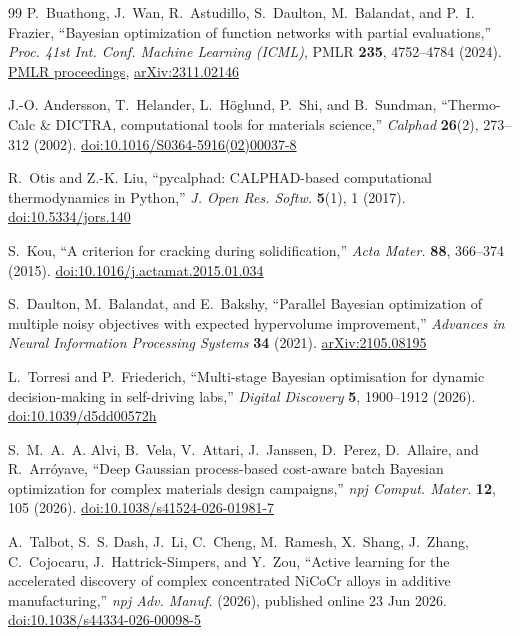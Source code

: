 \documentclass[12pt,letterpaper]{article}
\begin{document}
\begin{thebibliography}{99}
P.~Buathong, J.~Wan, R.~Astudillo, S.~Daulton, M.~Balandat, and P.~I. Frazier,
``Bayesian optimization of function networks with partial evaluations,''
\emph{Proc. 41st Int. Conf. Machine Learning (ICML)}, PMLR \textbf{235},
4752--4784 (2024).
\href{https://proceedings.mlr.press/v235/buathong24a.html}{PMLR proceedings},
\href{https://arxiv.org/abs/2311.02146}{arXiv:2311.02146}

J.-O. Andersson, T.~Helander, L.~H{\"o}glund, P.~Shi, and B.~Sundman,
``Thermo-Calc \& DICTRA, computational tools for materials science,''
\emph{Calphad} \textbf{26}(2), 273--312 (2002).
\href{https://doi.org/10.1016/S0364-5916(02)00037-8}{doi:10.1016/S0364-5916(02)00037-8}

R.~Otis and Z.-K. Liu, ``pycalphad: CALPHAD-based computational thermodynamics
in Python,'' \emph{J. Open Res. Softw.} \textbf{5}(1), 1 (2017).
\href{https://doi.org/10.5334/jors.140}{doi:10.5334/jors.140}

S.~Kou, ``A criterion for cracking during solidification,''
\emph{Acta Mater.} \textbf{88}, 366--374 (2015).
\href{https://doi.org/10.1016/j.actamat.2015.01.034}{doi:10.1016/j.actamat.2015.01.034}

S.~Daulton, M.~Balandat, and E.~Bakshy, ``Parallel Bayesian optimization of
multiple noisy objectives with expected hypervolume improvement,''
\emph{Advances in Neural Information Processing Systems} \textbf{34} (2021).
\href{https://arxiv.org/abs/2105.08195}{arXiv:2105.08195}

L.~Torresi and P.~Friederich, ``Multi-stage Bayesian optimisation for dynamic
decision-making in self-driving labs,'' \emph{Digital Discovery} \textbf{5},
1900--1912 (2026).
\href{https://doi.org/10.1039/d5dd00572h}{doi:10.1039/d5dd00572h}

S.~M.~A.~A. Alvi, B.~Vela, V.~Attari, J.~Janssen, D.~Perez, D.~Allaire, and
R.~Arr{\'o}yave, ``Deep Gaussian process-based cost-aware batch Bayesian
optimization for complex materials design campaigns,''
\emph{npj Comput. Mater.} \textbf{12}, 105 (2026).
\href{https://doi.org/10.1038/s41524-026-01981-7}{doi:10.1038/s41524-026-01981-7}

A.~Talbot, S.~S. Dash, J.~Li, C.~Cheng, M.~Ramesh, X.~Shang, J.~Zhang,
C.~Cojocaru, J.~Hattrick-Simpers, and Y.~Zou, ``Active learning for the
accelerated discovery of complex concentrated NiCoCr alloys in additive
manufacturing,'' \emph{npj Adv. Manuf.} (2026), published online 23 Jun 2026.
\href{https://doi.org/10.1038/s44334-026-00098-5}{doi:10.1038/s44334-026-00098-5}

\end{thebibliography}

\end{document}

